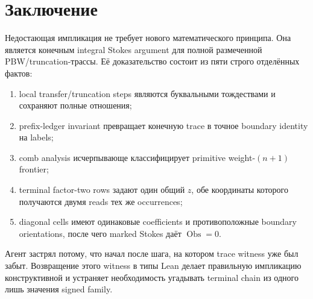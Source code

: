 \documentclass[11pt,a4paper]{article}
\theoremstyle{definition}
\theoremstyle{remark}
\newcommand{\Obs}{\operatorname{Obs}}
\begin{document}
\section{Заключение}

Недостающая импликация не требует нового математического принципа. Она
является конечным integral Stokes argument для полной размеченной
PBW/truncation-трассы. Её доказательство состоит из пяти строго отделённых
фактов:

\begin{enumerate}
\item local transfer/truncation steps являются буквальными тождествами и
сохраняют полные отношения;
\item prefix-ledger invariant превращает конечную trace в точное boundary
identity на labels;
\item comb analysis исчерпывающе классифицирует primitive weight-$(n+1)$
frontier;
\item terminal factor-two rows задают один общий $z$, обе координаты которого
получаются двумя reads тех же occurrences;
\item diagonal cells имеют одинаковые coefficients и противоположные boundary
orientations, после чего marked Stokes даёт $\Obs=0$.
\end{enumerate}

Агент застрял потому, что начал после шага, на котором trace witness уже был
забыт. Возвращение этого witness в типы Lean делает правильную импликацию
конструктивной и устраняет необходимость угадывать terminal chain из одного
лишь значения signed family.
\end{document}
